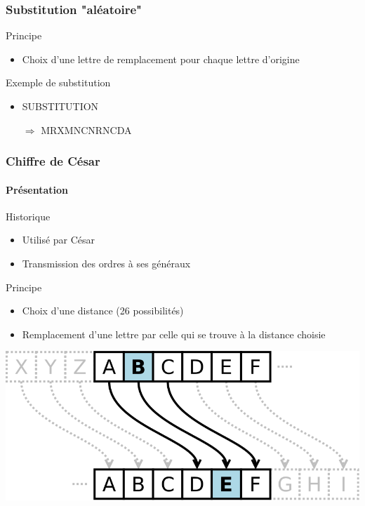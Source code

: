 \documentclass[xcolor={dvipsnames}]{beamer}
\begin{document}
\begin{frame}
	\frametitle{Substitution "aléatoire"}
	
	\begin{block}{Principe}
		\begin{itemize}
			\item Choix d'une lettre de remplacement pour chaque lettre d'origine
		\end{itemize}
	\end{block}
	
	\begin{exampleblock}{Exemple de substitution}
		
		\begin{center}
		\end{center}
		\begin{itemize}
			\item SUBSTITUTION\pause
			\item[$\Rightarrow$] MRXMNCNRNCDA
		\end{itemize}
		
		
	\end{exampleblock}
	
	
\end{frame}

\begin{frame}
\frametitle{Chiffre de César}
\framesubtitle{Présentation}

\begin{block}{Historique}
	\begin{itemize}
		\item Utilisé par César 
		\item Transmission des ordres à ses généraux 
	\end{itemize}
	\end{block}
	
	\begin{block}{Principe}
		\begin{itemize}
			\item Choix d'une distance (26 possibilités)
			\item Remplacement d'une lettre par celle qui se trouve à la distance choisie   
		\end{itemize}
		
		\begin{center}
			\includegraphics[scale=0.2]{cesar}			
		\end{center}

	\end{block}
	
\end{frame}
\end{document}
